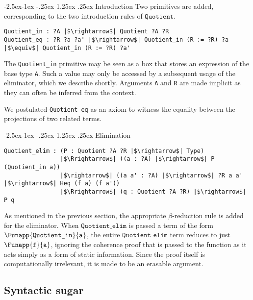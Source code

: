 \documentclass[12pt,twoside,maitrise]{dms}
\makeatletter
\theoremstyle{definition}
\numberwithin{equation}{section}
\numberwithin{table}{chapter}
\numberwithin{figure}{chapter}
\newcommand\id[1] {\texttt{#1}}
\renewcommand\paragraph{\@startsection{paragraph}{4}{\z@}%
            {-2.5ex\@plus -1ex \@minus -.25ex}%
            {1.25ex \@plus .25ex}%
            {\normalfont\normalsize\bfseries}}
\makeatother
\begin{document}
\paragraph{Introduction}
Two primitives are added, corresponding to the two introduction rules of $\id{Quotient}$.

\begin{verbatim}
Quotient_in : ?A |$\rightarrow$| Quotient ?A ?R
Quotient_eq : ?R ?a ?a' |$\rightarrow$| Quotient_in (R := ?R) ?a |$\equiv$| Quotient_in (R := ?R) ?a'
\end{verbatim}

The \id{Quotient\_in} primitive may be seen as a box that stores an expression
of the base type \id{A}. Such a value may only be accessed by a subsequent usage
of the eliminator, which we describe shortly. Arguments \id{A} and \id{R} are
made implicit as they can often be inferred from the context.

We postulated \id{Quotient\_eq} as an axiom to witness the equality between the
projections of two related terms.

\paragraph{Elimination}

\begin{verbatim}
Quotient_elim : (P : Quotient ?A ?R |$\rightarrow$| Type)
                |$\Rrightarrow$| ((a : ?A) |$\rightarrow$| P (Quotient_in a))
                |$\rightarrow$| ((a a' : ?A) |$\rightarrow$| ?R a a' |$\rightarrow$| Heq (f a) (f a'))
                |$\Rrightarrow$| (q : Quotient ?A ?R) |$\rightarrow$| P q
\end{verbatim}

As mentioned in the previous section, the appropriate $\beta$-reduction rule is
added for the eliminator. When $\id{Quotient\_elim}$ is passed a term of the
form $\Funapp{\id{Quotient\_in}}{\id{a}}$, the entire $\id{Quotient\_elim}$ term
reduces to just $\Funapp{\id{f}}{\id{a}}$, ignoring the coherence proof that is
passed to the function as it acts simply as a form of static information. Since
the proof itself is computationally irrelevant, it is made to be an erasable
argument.

\subsection{Syntactic sugar}
\end{document}
